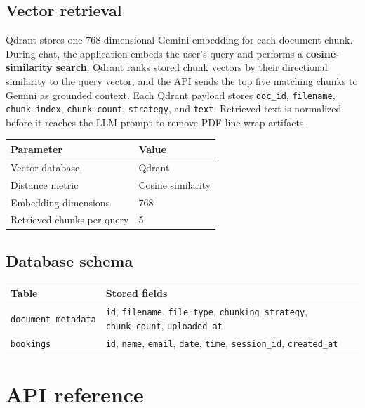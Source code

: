 \documentclass[12pt, a4paper]{article}
\begin{document}
\subsection{Vector retrieval}

Qdrant stores one 768-dimensional Gemini embedding for each document chunk.
During chat, the application embeds the user's query and performs a
\textbf{cosine-similarity search}. Qdrant ranks stored chunk vectors by their
directional similarity to the query vector, and the API sends the top five
matching chunks to Gemini as grounded context. Each Qdrant payload stores
\texttt{doc\_id}, \texttt{filename}, \texttt{chunk\_index},
\texttt{chunk\_count}, \texttt{strategy}, and \texttt{text}. Retrieved text is
normalized before it reaches the LLM prompt to remove PDF line-wrap artifacts.

\begin{center}
\begin{tabular}{L{5cm} L{8cm}}
    \toprule
    \textbf{Parameter} & \textbf{Value} \\
    \midrule
    Vector database & Qdrant \\
    Distance metric & Cosine similarity \\
    Embedding dimensions & 768 \\
    Retrieved chunks per query & 5 \\
    \bottomrule
\end{tabular}
\end{center}

\subsection{Database schema}

\begin{tabularx}{\textwidth}{L{3.5cm} Y}
    \toprule
    \textbf{Table} & \textbf{Stored fields} \\
    \midrule
    \texttt{document\_metadata} &
    \texttt{id}, \texttt{filename}, \texttt{file\_type},
    \texttt{chunking\_strategy}, \texttt{chunk\_count},
    \texttt{uploaded\_at} \\
    \texttt{bookings} &
    \texttt{id}, \texttt{name}, \texttt{email}, \texttt{date},
    \texttt{time}, \texttt{session\_id}, \texttt{created\_at} \\
    \bottomrule
\end{tabularx}

\section{API reference}
\end{document}
